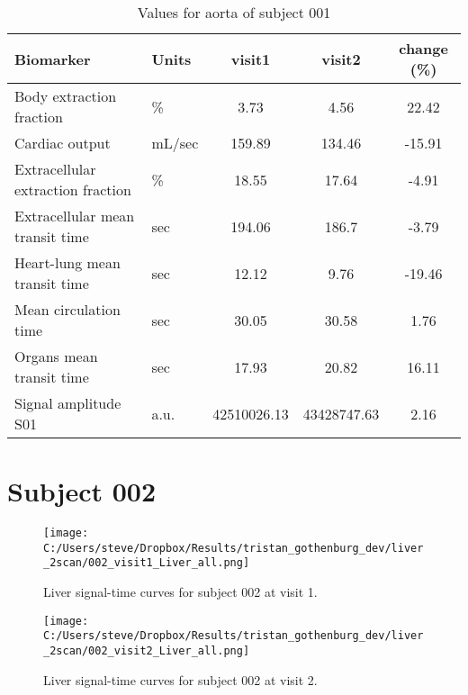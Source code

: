 \documentclass{epflreport}%
\begin{document}
%


\begin{table}[h!]%
\centering%
\begin{tabular}{llccc}%
\hline%
Biomarker&Units&visit1&visit2&change (\%)\\%
\hline%
Body extraction fraction&\%&3.73&4.56&22.42\\%
Cardiac output&mL/sec&159.89&134.46&{-}15.91\\%
Extracellular extraction fraction&\%&18.55&17.64&{-}4.91\\%
Extracellular mean transit time&sec&194.06&186.7&{-}3.79\\%
Heart{-}lung mean transit time&sec&12.12&9.76&{-}19.46\\%
Mean circulation time&sec&30.05&30.58&1.76\\%
Organs mean transit time&sec&17.93&20.82&16.11\\%
Signal amplitude S01&a.u.&42510026.13&43428747.63&2.16\\%
\hline%
\end{tabular}%
\caption{Values for aorta of subject 001}%
\end{table}

%
\clearpage%
\section{Subject 002}%
\label{sec:Subject002}%


\begin{figure}[h!]%
\centering%
\texttt{[image: C:/Users/steve/Dropbox/Results/tristan\_gothenburg\_dev/liver\_2scan/002\_visit1\_Liver\_all.png]}%
\caption{Liver signal{-}time curves for subject 002 at visit 1.}%
\end{figure}

%


\begin{figure}[h!]%
\centering%
\texttt{[image: C:/Users/steve/Dropbox/Results/tristan\_gothenburg\_dev/liver\_2scan/002\_visit2\_Liver\_all.png]}%
\caption{Liver signal{-}time curves for subject 002 at visit 2.}%
\end{figure}

%
\end{document}
